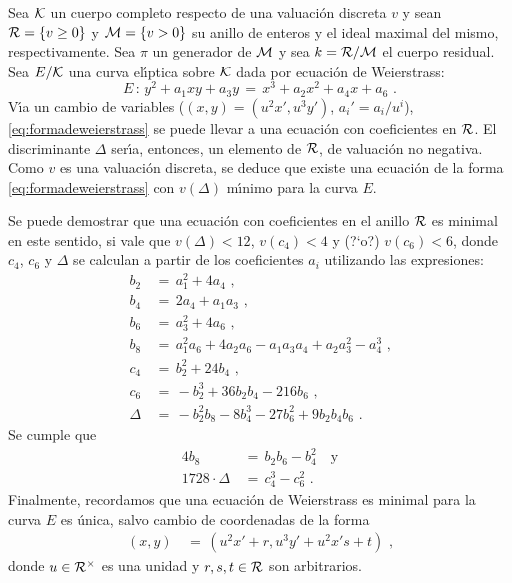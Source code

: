 Sea $\cal{K}$ un cuerpo completo respecto de una valuaci\'{o}n discreta $v$ y
sean $\cal{R}=\{v\geq 0\}$ y $\cal{M}=\{v>0\}$ su anillo de enteros y el ideal
maximal del mismo, respectivamente. Sea $\pi$ un generador de $\cal{M}$ y sea
$k=\cal{R}/\cal{M}$ el cuerpo residual. Sea $E/\cal{K}$ una curva el\'{\i}ptica
sobre $\cal{K}$ dada por ecuaci\'{o}n de Weierstrass:
\begin{equation}
	\label{eq:formadeweierstrass}
	E \,:\,y^{2} +a_{1}xy +a_{3}y \,=\,x^{3} +a_{2}x^{2} +a_{4}x +a_{6}
	\text{ .}
\end{equation}
%
V\'{\i}a un cambio de variables ($(x,y)=(u^{2}x',u^{3}y')$,
$a_{i}'=a_{i}/u^{i}$), \eqref{eq:formadeweierstrass} se puede llevar a una
ecuaci\'{o}n con coeficientes en $\cal{R}$. El discriminante $\Delta$
ser\'{\i}a, entonces, un elemento de $\cal{R}$, de valuaci\'{o}n no negativa.
Como $v$ es una valuaci\'{o}n discreta, se deduce que existe una ecuaci\'{o}n
de la forma \eqref{eq:formadeweierstrass} con $v(\Delta)$ m\'{\i}nimo para la
curva $E$.

Se puede demostrar que una ecuaci\'{o}n con coeficientes en el anillo $\cal{R}$
es minimal en este sentido, si vale que $v(\Delta)<12$, $v(c_{4})<4$ y (?`o?)
$v(c_{6})<6$, donde $c_{4}$, $c_{6}$ y $\Delta$ se calculan a partir de los
coeficientes $a_{i}$ utilizando las expresiones:
\begin{equation}
	\label{eq:definiciondeloscoeficientes}
	\begin{aligned}
		b_{2} & \,=\, a_{1}^{2}+4a_{4} \text{ ,} \\
		b_{4} & \,=\, 2a_{4}+a_{1}a_{3}\text{ ,} \\
		b_{6} & \,=\, a_{3}^{2}+4a_{6} \text{ ,} \\
		b_{8} & \,=\, a_{1}^{2}a_{6}+4a_{2}a_{6}-a_{1}a_{3}a_{4}+
			a_{2}a_{3}^{2}-a_{4}^{3} \text{ ,} \\
		c_{4} & \,=\, b_{2}^{2} +24b_{4} \text{ ,} \\
		c_{6} & \,=\,-b_{2}^{3}+36b_{2}b_{4}-216b_{6} \text{ ,} \\
		\Delta & \,=\,-b_{2}^{2}b_{8}-8b_{4}^{3}-27b_{6}^{2}+
			9b_{2}b_{4}b_{6}
		\text{ .}
	\end{aligned}
\end{equation}
%
Se cumple que
\begin{equation}
	\label{eq:relacionesentrecoeficientes}
	\begin{aligned}
		4b_{8} & \,=\,b_{2}b_{6}-b_{4}^{2} \quad\text{y} \\
		1728\cdot \Delta & \,=\,c_{4}^{3} -c_{6}^{2}
		\text{ .}
	\end{aligned}
\end{equation}
%
Finalmente, recordamos que una ecuaci\'{o}n de Weierstrass es minimal para la
curva $E$ es \'{u}nica, salvo cambio de coordenadas de la forma
\begin{align*}
	(x,y) & \,=\,(u^{2}x'+r,u^{3}y'+u^{2}x's+t)
	\text{ ,}
\end{align*}
%
donde $u\in\cal{R}^{\times}$ es una unidad y $r,s,t\in\cal{R}$ son arbitrarios.

